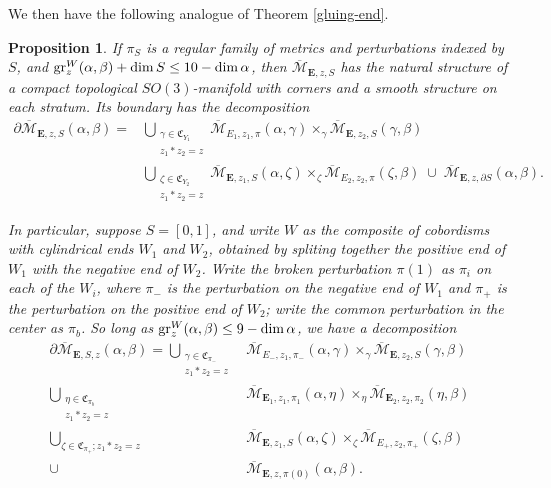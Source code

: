 \documentclass{memo-l}
\newtheorem{proposition}[theorem]{Proposition}
\theoremstyle{definition}
\theoremstyle{remark}
\numberwithin{section}{chapter}
\numberwithin{equation}{chapter}
\begin{document}
We then have the following analogue of Theorem \ref{gluing-end}.

\begin{proposition}\label{famgluing}If $\pi_S$ is a regular family of metrics and perturbations indexed by $S$, and $\textup{gr}^W_z(\alpha, \beta) + \dim S \leq 10 - \dim \alpha$, then $\overline{\mathcal M}_{\mathbf{E},z,S}$ has the natural structure of a compact topological $SO(3)$-manifold with corners and a smooth structure on each stratum. Its boundary has the decomposition
\begin{align*}\partial \overline{\mathcal M}_{\mathbf{E},z,S}(\alpha, \beta) = &\bigcup_{\substack{\gamma \in \mathfrak C_{Y_1}\\ z_1 * z_2 = z}}\overline{\mathcal M}_{E_1,z_1,\pi}(\alpha, \gamma) \times_\gamma \overline{\mathcal M}_{\mathbf{E},z_2,S}(\gamma, \beta)\\ &\bigcup_{\substack{\zeta \in \mathfrak C_{Y_2} \\ z_1 * z_2 = z}} \overline{\mathcal M}_{\mathbf{E},z_1,S}(\alpha, \zeta) \times_\zeta \overline{\mathcal M}_{E_2,z_2,\pi}(\zeta, \beta) \;\cup \; \overline{\mathcal M}_{\mathbf{E},z,\partial S}(\alpha, \beta).
\end{align*}

In particular, suppose $S = [0,1]$, and write $W$ as the composite of cobordisms with cylindrical ends $W_1$ and $W_2$, obtained by spliting together the positive end of $W_1$ with the negative end of $W_2$. Write the broken perturbation $\pi(1)$ as $\pi_i$ on each of the $W_i$, where $\pi_-$ is the perturbation on the negative end of $W_1$ and $\pi_+$ is the perturbation on the positive end of $W_2$; write the common perturbation in the center as $\pi_b$. So long as $\textup{gr}_z^W(\alpha, \beta) \leq 9-\dim \alpha$, we have a decomposition
\begin{align*}\partial \overline{\mathcal M}_{\mathbf E,S,z}(\alpha, \beta) = \bigcup_{\substack{\gamma \in \mathfrak C_{\pi_-}\\ z_1 \ast z_2 = z}} &\overline{\mathcal M}_{E_-,z_1,\pi_-}(\alpha, \gamma) \times_\gamma \overline{\mathcal M}_{\mathbf{E},z_2,S}(\gamma, \beta)\\
\bigcup_{\substack{\eta \in \mathfrak C_{\pi_b}\\ z_1 \ast z_2 = z}} &\overline{\mathcal M}_{\mathbf{E}_1,z_1,\pi_1}(\alpha, \eta) \times_\eta \overline{\mathcal M}_{\mathbf{E}_2,z_2,\pi_2}(\eta, \beta)\\
\bigcup_{\zeta \in \mathfrak C_{\pi_+}; z_1 \ast z_2 = z} &\overline{\mathcal M}_{\mathbf{E},z_1,S}(\alpha, \zeta) \times_\zeta \overline{\mathcal M}_{E_+,z_2,\pi_+}(\zeta, \beta)\\
\cup \; \; \; \; &\overline{\mathcal M}_{\mathbf{E},z,\pi(0)}(\alpha, \beta).\\
\end{align*}
\end{proposition}
\end{document}
